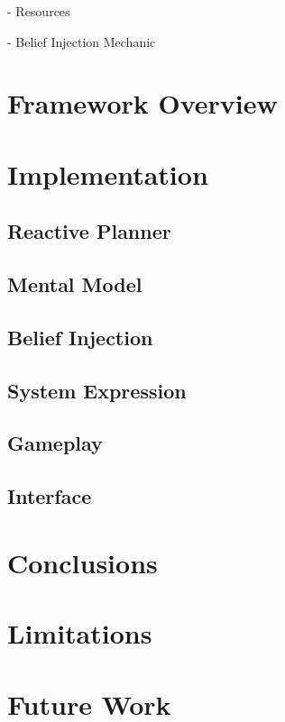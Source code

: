 \documentclass[letterpaper, 10 pt, conference]{ieeeconf}  %
\begin{document}
- Resources

- Belief Injection Mechanic

\section{Framework Overview}

\section{Implementation}
\subsection{Reactive Planner}
\subsection{Mental Model}
\subsection{Belief Injection}
\subsection{System Expression}
\subsection{Gameplay}
\subsection{Interface}



\section{Conclusions}


\section{Limitations}

\section{Future Work}

\addtolength{\textheight}{-12cm}   %
\end{document}
